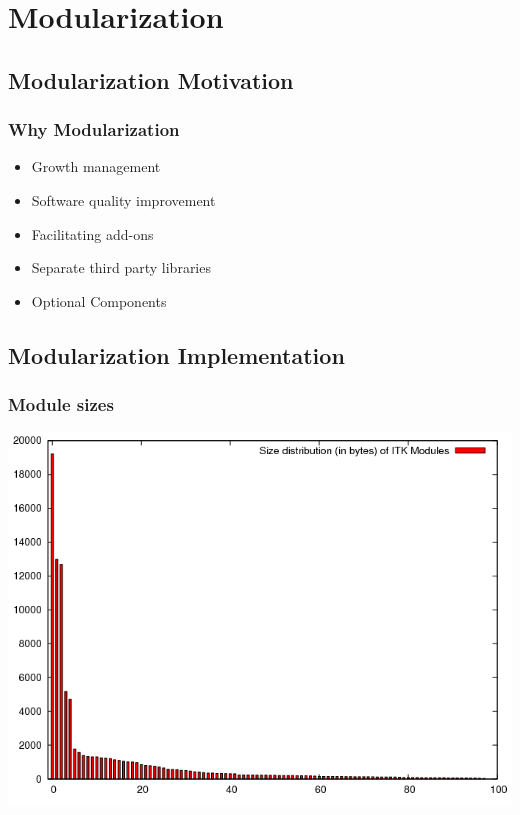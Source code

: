 \section{Modularization}

\subsection{Modularization Motivation}

\begin{frame}
\frametitle{Why Modularization}
\begin{itemize}
\item Growth management
\pause
\item Software quality improvement
\pause
\item Facilitating add-ons
\pause
\item Separate third party libraries
\pause
\item Optional Components
\end{itemize}
\end{frame}

\subsection{Modularization Implementation}

\begin{frame}
\frametitle{Module sizes}
\center
\begin{center}
\includegraphics[height=0.8\textheight]{../Art/moduleSizePlot.png}
\end{center}
\end{frame}


